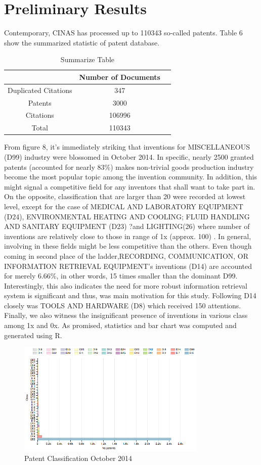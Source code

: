 \documentclass{sig-alternate}
\begin{document}
{\section{Preliminary Results}
Contemporary, CINAS has processed up to 110343 so-called patents. Table 6 show the summarized statistic of patent database.
\begin{table}[htd]
\begin{tabular}{|c|c|l|} \hline
 &Number of Documents\\ \hline
 Duplicated Citations&347 \\ \hline
Patents&3000 \\ \hline
Citations&106996 \\ \hline
Total & 110343\\ \hline
\end{tabular}
\caption{Summarize Table}
\end{table}
From figure 8, it's immediately striking that inventions for MISCELLANEOUS (D99) industry were blossomed in October 2014. In specific, nearly 2500 granted patents (accounted for nearly 83\%) makes non-trivial goods production industry become the most popular topic among the invention community. In addition, this might signal a competitive field for any inventors that shall want to take part in. On the opposite, classification that are larger than 20 were recorded at lowest level, except for the case of  MEDICAL AND LABORATORY EQUIPMENT (D24), ENVIRONMENTAL HEATING AND COOLING; FLUID HANDLING AND SANITARY EQUIPMENT (D23)
?and LIGHTING(26) where number of inventions are relatively close to those in range of 1x (approx. 100) . In general, involving in these fields might be less competitive than the others. Even though coming in second place of the ladder,RECORDING, COMMUNICATION, OR INFORMATION RETRIEVAL EQUIPMENT's inventions (D14) are accounted for merely 6.66\%, in other words, 15 times smaller than the dominant D99. Interestingly, this also indicates the need for more robust information retrieval system is significant and thus, was main motivation for this study. Following D14 closely was TOOLS AND HARDWARE (D8) which received 150 attentions. Finally, we  also witness the insignificant presence of inventions in various class among 1x and 0x. As promised, statistics and bar chart was computed and generated using R. 
\begin{figure}[htb]
\centering
\includegraphics[width=90mm]{rplot-classification.png}
\caption{ Patent Classification October 2014 }
\end{figure}

}
\end{document}
